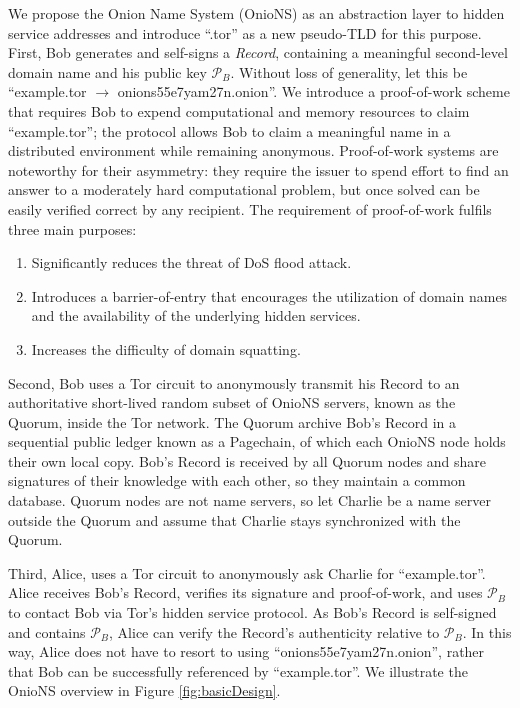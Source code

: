 \documentclass[conference]{IEEEtran}
\begin{document}
We propose the Onion Name System (OnioNS) as an abstraction layer to hidden service addresses and introduce ``.tor'' as a new pseudo-TLD for this purpose. First, Bob generates and self-signs a \emph{Record}, containing a meaningful second-level domain name and his public key $ \mathcal{P}_{B} $. Without loss of generality, let this be ``example.tor $ \rightarrow $ onions55e7yam27n.onion''. We introduce a proof-of-work scheme that requires Bob to expend computational and memory resources to claim ``example.tor''; the protocol allows Bob to claim a meaningful name in a distributed environment while remaining anonymous. Proof-of-work systems are noteworthy for their asymmetry: they require the issuer to spend effort to find an answer to a moderately hard computational problem, but once solved can be easily verified correct by any recipient. The requirement of proof-of-work fulfils three main purposes:

\begin{enumerate}
	\item Significantly reduces the threat of DoS flood attack.
	\item Introduces a barrier-of-entry that encourages the utilization of domain names and the availability of the underlying hidden services.
	\item Increases the difficulty of domain squatting.
\end{enumerate}

Second, Bob uses a Tor circuit to anonymously transmit his Record to an authoritative short-lived random subset of OnioNS servers, known as the Quorum, inside the Tor network. The Quorum archive Bob's Record in a sequential public ledger known as a Pagechain, of which each OnioNS node holds their own local copy. Bob's Record is received by all Quorum nodes and share signatures of their knowledge with each other, so they maintain a common database. Quorum nodes are not name servers, so let Charlie be a name server outside the Quorum and assume that Charlie stays synchronized with the Quorum.

Third, Alice, uses a Tor circuit to anonymously ask Charlie for ``example.tor''. Alice receives Bob's Record, verifies its signature and proof-of-work, and uses $ \mathcal{P}_{B} $ to contact Bob via Tor's hidden service protocol. As Bob's Record is self-signed and contains $ \mathcal{P}_{B} $, Alice can verify the Record's authenticity relative to $ \mathcal{P}_{B} $. In this way, Alice does not have to resort to using ``onions55e7yam27n.onion'', rather that Bob can be successfully referenced by ``example.tor''. We illustrate the OnioNS overview in Figure \ref{fig:basicDesign}.
\end{document}
